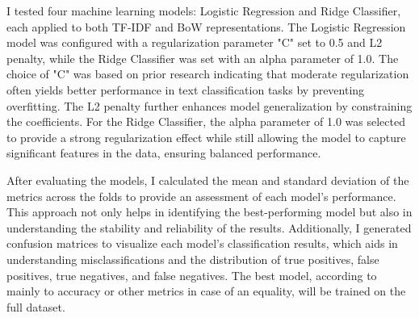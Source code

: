 I tested four machine learning models: Logistic Regression and Ridge Classifier, each applied to both TF-IDF and BoW representations. The Logistic Regression model was configured with 
a regularization parameter "C" set to 0.5 and L2 penalty, while the Ridge Classifier was set with an alpha parameter of 1.0. The choice of "C" was based on prior research indicating that 
moderate regularization often yields better performance in text classification tasks by preventing overfitting. The L2 penalty further enhances model generalization by constraining the 
coefficients. For the Ridge Classifier, the alpha parameter of 1.0 was selected to provide a strong regularization effect while still allowing the model to capture significant features 
in the data, ensuring balanced performance.

After evaluating the models, I calculated the mean and standard deviation of the metrics across the folds to provide an assessment of each model's performance. This approach not only 
helps in identifying the best-performing model but also in understanding the stability and reliability of the results. Additionally, I generated confusion matrices to visualize each 
model's classification results, which aids in understanding misclassifications and the distribution of true positives, false positives, true negatives, and false negatives. 
The best model, according to mainly to accuracy or other metrics in case of an equality, will be trained on the full dataset.